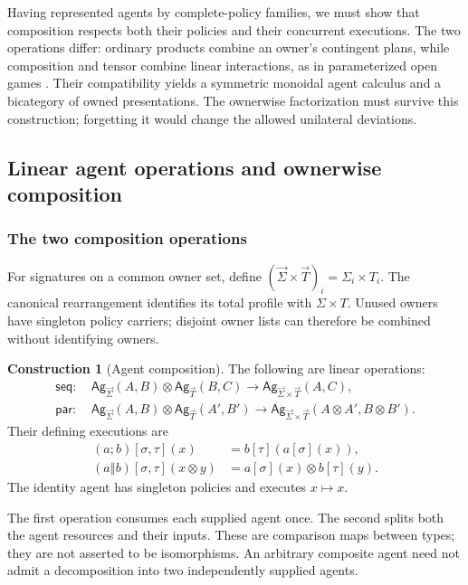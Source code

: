 \documentclass[11pt,a4paper]{article}
\numberwithin{equation}{section}
\theoremstyle{definition}
\newtheorem{construction}[construction]{Construction}
\theoremstyle{remark}
\theoremstyle{plain}
\providecommand{\Ag}{\mathsf{Ag}}
\providecommand{\sig}{\vec{\Sigma}}
\providecommand{\taus}{\vec{T}}
\providecommand{\seq}{\mathbin{;}}
\providecommand{\parcomp}{\mathbin{\Vert}}
\begin{document}
Having represented agents by complete-policy families, we must show
that composition respects both their policies and their concurrent
executions. The two operations differ: ordinary products combine an
owner's contingent plans, while composition and tensor combine linear
interactions, as in parameterized open games
\citep{GhaniEtAl2018,AtkeyEtAl2021}. Their compatibility yields a
symmetric monoidal agent calculus and a bicategory of owned presentations.
The ownerwise factorization must survive this construction; forgetting it
would change the allowed unilateral deviations.

\subsection{Linear agent operations and ownerwise composition}
\label{agt-sec-composition}

\subsubsection{The two composition operations}

For signatures on a common owner set, define
$(\sig\times\taus)_i=\Sigma_i\times T_i$. The canonical rearrangement
identifies its total profile with $\Sigma\times T$. Unused owners have
singleton policy carriers; disjoint owner lists can therefore be combined
without identifying owners.

\begin{construction}[Agent composition]
The following are linear operations:
\begin{align*}
 \mathsf{seq}:&\ \Ag_{\sig}(A,B)\otimes\Ag_{\taus}(B,C)
       \longrightarrow\Ag_{\sig\times\taus}(A,C),\\
 \mathsf{par}:&\ \Ag_{\sig}(A,B)\otimes\Ag_{\taus}(A',B')
       \longrightarrow\Ag_{\sig\times\taus}(A\otimes A',B\otimes B').
\end{align*}
Their defining executions are
\begin{align}
 (a\seq b)[\sigma,\tau](x)&=b[\tau](a[\sigma](x)),
 \label{agt-eq-seq}\\
 (a\parcomp b)[\sigma,\tau](x\otimes y)
 &=a[\sigma](x)\otimes b[\tau](y).
 \label{agt-eq-par}
\end{align}
The identity agent has singleton policies and executes $x\mapsto x$.
\end{construction}

The first operation consumes each supplied agent once. The second splits
both the agent resources and their inputs. These are comparison maps between
types; they are not asserted to be isomorphisms. An arbitrary composite
agent need not admit a decomposition into two independently supplied agents.
\end{document}
